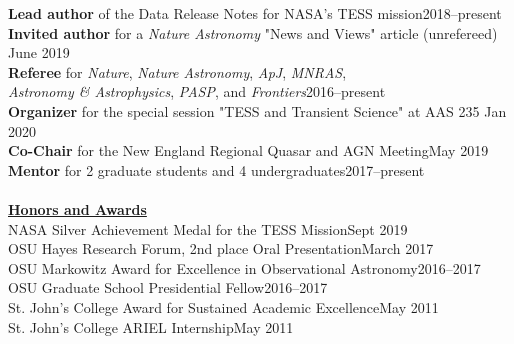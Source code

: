 \documentclass[letterpaper,11pt]{article}
\newcommand{\award}[2]{#1\hfill#2}
\begin{document}
 \textbf{Lead author} of the Data Release Notes for NASA's TESS mission\hfill 2018--present\\
\textbf{Invited author} for a \textit{Nature Astronomy} "News and Views" article (unrefereed) \hfill June 2019\\
\textbf{Referee} for \textit{Nature}, \textit{Nature Astronomy}, \textit{ApJ}, \textit{MNRAS}, \\ \indent \textit{Astronomy \& Astrophysics}, \textit{PASP}, and
  \textit{Frontiers}\hfill 2016--present\\%
 \textbf{Organizer} for the special session "TESS and Transient Science" at  AAS 235 \hfill Jan 2020\\
  \textbf{Co-Chair} for the New England Regional Quasar and AGN Meeting\hfill May 2019\\
   \textbf{Mentor} for 2 graduate students and 4 undergraduates\hfill 2017--present\\
\\
\noindent\underline{\textbf{Honors and Awards}}\\
\award{NASA Silver Achievement Medal for the TESS Mission}{Sept 2019}\\
\award{OSU Hayes Research Forum, 2nd place Oral Presentation}{March 2017} \\
\award{OSU Markowitz Award for Excellence in Observational Astronomy}{2016--2017}\\
\award{OSU Graduate School Presidential Fellow}{2016--2017}\\
\award{St. John's College Award for Sustained Academic Excellence}{May 2011}\\
\award{St. John's College ARIEL Internship}{May 2011}\\
\\
\end{document}
